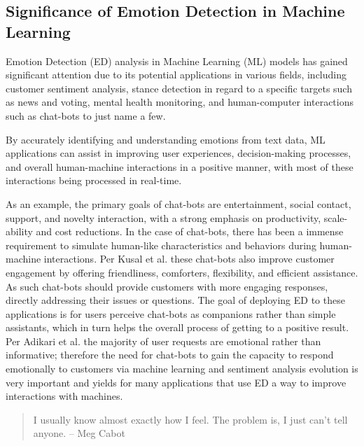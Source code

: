 \documentclass[11pt]{article}
\begin{document}
\subsection{Significance of Emotion Detection in Machine Learning}
Emotion Detection (ED) analysis in Machine Learning (ML) models has gained significant attention due to its potential applications in various fields, including customer sentiment analysis, stance detection in regard to a specific targets such as news and voting\cite{mascarell-etal-2021-stance}, mental health monitoring\cite{Colonnello}, and human-computer interactions such as chat-bots\cite{chatbot-cognitive-awareness} to just name a few.

By accurately identifying and understanding emotions from text data, ML applications can assist in improving user experiences, decision-making processes, and overall human-machine interactions in a positive manner\cite{Colonnello, mascarell-etal-2021-stance}, with most of these interactions being processed in real-time.

As an example, the primary goals of chat-bots are entertainment, social contact, support, and novelty interaction, with a strong emphasis on productivity, scale-ability and cost reductions. In the case of chat-bots, there has been a immense requirement to simulate human-like characteristics and behaviors during human-machine interactions\cite{emotion-detection-literature-review}. Per Kusal et al. \cite{chatbot-cognitive-awareness} these chat-bots also improve customer engagement by offering friendliness, comforters, flexibility, and efficient assistance. As such chat-bots should provide customers with more engaging responses, directly addressing their issues or questions. The goal of deploying ED to these applications is for users perceive chat-bots as companions rather than simple assistants, which in turn helps the overall process of getting to a positive result. Per Adikari et al. the majority of user requests are emotional rather than informative; therefore the need for chat-bots to gain the capacity to respond emotionally to customers via machine learning and sentiment analysis evolution\cite{chatbot-cognitive-awareness} is very important and yields for many applications that use ED a way to improve interactions with machines.

\begin{quote}
    I usually know almost exactly how I feel. The problem is, I just can’t tell anyone.
    \flushright -- Meg Cabot
\end{quote}
\end{document}
